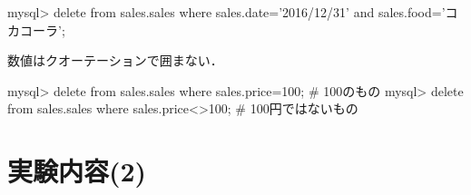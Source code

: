 \begin{cli}
mysql> delete from sales.sales where sales.date='2016/12/31' and
 sales.food='コカコーラ';
\end{cli}

数値はクオーテーションで囲まない．

\begin{cli}
mysql> delete from sales.sales where sales.price=100;
# 100のもの
mysql> delete from sales.sales where sales.price<>100;
# 100円ではないもの
\end{cli}






\clearpage
\section{実験内容(2)}

%
%
%
%
%
%
